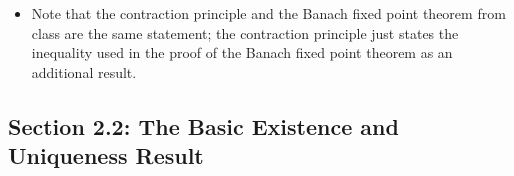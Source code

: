 \documentclass[../notes.tex]{subfiles}
\begin{document}
\begin{itemize}
\begin{equation*}
    \end{equation*}
    for all $x\in C$.
    \begin{proof}
        As in class.\par
        Note that we use the closed-ness hypothesis to guarantee that $C$ is still complete, i.e., that $\bar{x}\in C$ (we could very well define $K$ on $C\setminus\{\bar{x}\}$, and it would still be a contraction). 
    \end{proof}
    \item Note that the contraction principle and the Banach fixed point theorem from class are the same statement; the contraction principle just states the inequality used in the proof of the Banach fixed point theorem as an additional result.
\end{itemize}


\subsection*{Section 2.2: The Basic Existence and Uniqueness Result}
\end{document}
